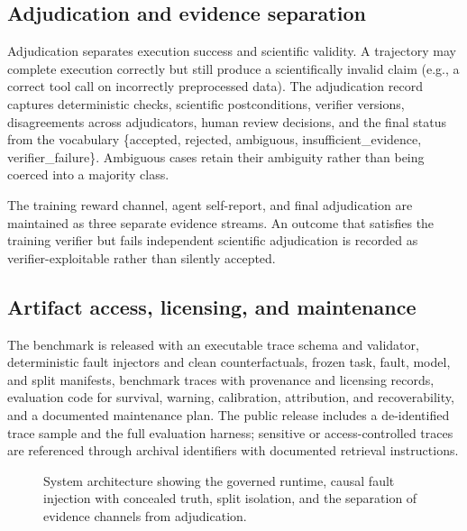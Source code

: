 \subsection{Adjudication and evidence separation}

Adjudication separates execution success and scientific validity. A
trajectory may complete execution correctly but still produce a
scientifically invalid claim (e.g., a correct tool call on incorrectly
preprocessed data). The adjudication record captures deterministic checks,
scientific postconditions, verifier versions, disagreements across
adjudicators, human review decisions, and the final status from the
vocabulary \{accepted, rejected, ambiguous, insufficient\_evidence,
verifier\_failure\}. Ambiguous cases retain their ambiguity rather than
being coerced into a majority class.

The training reward channel, agent self-report, and final adjudication are
maintained as three separate evidence streams. An outcome that satisfies the
training verifier but fails independent scientific adjudication is recorded
as verifier-exploitable rather than silently accepted.

\subsection{Artifact access, licensing, and maintenance}

The benchmark is released with an executable trace schema and validator,
deterministic fault injectors and clean counterfactuals, frozen task, fault,
model, and split manifests, benchmark traces with provenance and licensing
records, evaluation code for survival, warning, calibration, attribution,
and recoverability, and a documented maintenance plan. The public release
includes a de-identified trace sample and the full evaluation harness;
sensitive or access-controlled traces are referenced through archival
identifiers with documented retrieval instructions.

\begin{figure}[t]
\centering
{}
\caption{System architecture showing the governed runtime, causal fault
injection with concealed truth, split isolation, and the separation of
evidence channels from adjudication.}
\label{fig:benchmark_architecture}
\end{figure}

